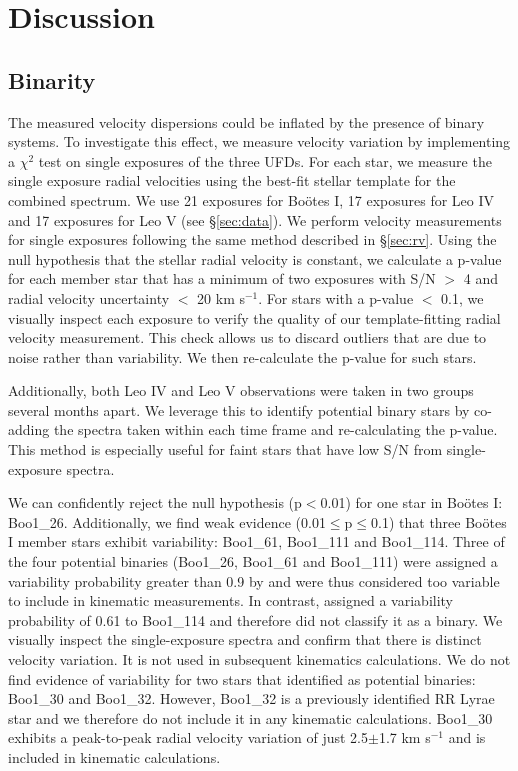 \documentclass[twocolumn]{aastex63}
\newcommand{\revise}[1]{#1}
\begin{document}
\section{Discussion}
\label{sec:discussion}
\subsection{Binarity} 
\label{sec:binaries}
The measured velocity dispersions could be inflated by the presence of binary systems. To investigate this effect, we measure velocity variation by implementing a $\chi^2$ test on single exposures of the three UFDs. \revise{For each star, we measure the single exposure radial velocities using the best-fit stellar template for the combined spectrum.} We use 21 exposures for Bo{\"o}tes I, 17 exposures for Leo IV and 17 exposures for Leo V (see \S\ref{sec:data}). We perform velocity measurements for single exposures following the same method described in \S\ref{sec:rv}. Using the null hypothesis that the stellar radial velocity is constant, we calculate a p-value for each member star that has a minimum of two exposures with S/N $>$ 4 and radial velocity uncertainty $<$ 20 km s$^{-1}$. For stars with a p-value $<$ 0.1, we visually inspect each exposure to verify the quality of our template-fitting radial velocity measurement. This check allows us to discard outliers that are due to noise rather than variability. We then re-calculate the p-value for such stars. 

Additionally, both Leo IV and Leo V observations were taken in two groups several months apart. We leverage this to identify potential binary stars by co-adding the spectra taken within each time frame and re-calculating the p-value. This method is especially useful for faint stars that have low S/N from single-exposure spectra.

We can confidently reject the null hypothesis (p$<$0.01) for one star in Bo{\"o}tes I: Boo1\_26. Additionally, we find weak evidence (0.01$\le$p$\le$0.1) that three Bo{\"o}tes I member stars exhibit variability: Boo1\_61, Boo1\_111 and Boo1\_114. Three of the four potential binaries (Boo1\_26, Boo1\_61 and Boo1\_111) were assigned a variability probability greater than 0.9 by \citet{kop2011} and were thus considered too variable to include in kinematic measurements. In contrast, \citet{kop2011} assigned a variability probability of 0.61 to Boo1\_114 and therefore did not classify it as a binary. We visually inspect the single-exposure spectra and confirm that there is distinct velocity variation. It is not used in subsequent kinematics calculations. We do not find evidence of variability for two stars that \citet{kop2011} identified as potential binaries: Boo1\_30 and Boo1\_32. However, Boo1\_32 is a previously identified RR Lyrae star and we therefore do not include it in any kinematic calculations. Boo1\_30 exhibits a peak-to-peak radial velocity variation of just 2.5$\pm$1.7 km s$^{-1}$ and is included in kinematic calculations. 
\end{document}
